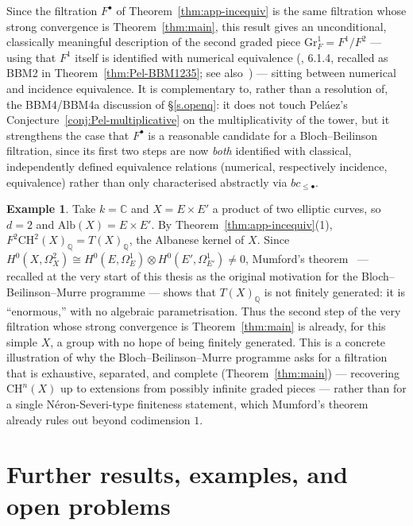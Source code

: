\documentclass[12pt,a4paper]{article}
\theoremstyle{definition}
\newtheorem{example}[theorem]{Example}
\newcommand{\Gr}{\mathrm{Gr}}
\newcommand{\CH}{\mathrm{CH}}
\newcommand{\Q}{\mathbb{Q}}
\newcommand{\Alb}{\mathrm{Alb}}
\begin{document}
Since the filtration $F^\bullet$ of Theorem~\ref{thm:app-incequiv} is the same
filtration whose strong convergence is Theorem~\ref{thm:main}, this result
gives an unconditional, classically meaningful description of the second
graded piece $\Gr_F^1=F^1/F^2$ — using that $F^1$ itself is identified with
numerical equivalence (\cite{Pel17}, 6.1.4, recalled as BBM2 in
Theorem~\ref{thm:Pel-BBM1235}; see also~\cite{PelRey25}) — sitting between
numerical and incidence equivalence.  It is complementary to, rather than a
resolution of, the BBM4/BBM4a discussion of \S\ref{s.openq}: it does not touch
Peláez's Conjecture~\ref{conj:Pel-multiplicative} on the multiplicativity of
the tower, but it strengthens the case that $F^\bullet$ is a reasonable
candidate for a Bloch--Beilinson filtration, since its first two steps are
now \emph{both} identified with classical, independently defined equivalence
relations (numerical, respectively incidence, equivalence) rather than only
characterised abstractly via $bc_{\leq\bullet}$.

\begin{example}
Take $k=\mathbb{C}$ and $X=E\times E'$ a product of two elliptic curves, so
$d=2$ and $\Alb(X)=E\times E'$.  By Theorem~\ref{thm:app-incequiv}(1),
$F^2\CH^2(X)_\Q=T(X)_\Q$, the Albanese kernel of $X$.  Since
$H^0(X,\Omega^2_X)\cong H^0(E,\Omega^1_E)\otimes H^0(E',\Omega^1_{E'})\neq0$,
Mumford's theorem~\cite{Mum69} — recalled at the very start of this thesis
as the original motivation for the Bloch--Beilinson--Murre programme —
shows that $T(X)_\Q$ is not finitely generated: it is ``enormous,'' with no
algebraic parametrisation.  Thus the second step of the very filtration
whose strong convergence is Theorem~\ref{thm:main} is already, for this
simple $X$, a group with no hope of being finitely generated.  This is a
concrete illustration of why the Bloch--Beilinson--Murre programme asks for
a filtration that is exhaustive, separated, and complete
(Theorem~\ref{thm:main}) — recovering $\CH^n(X)$ up to extensions from
possibly infinite graded pieces — rather than for a single Néron-Severi-type
finiteness statement, which Mumford's theorem already rules out beyond
codimension $1$.
\end{example}

\section*{Further results, examples, and open problems}
\label{s.openq}
\end{document}
